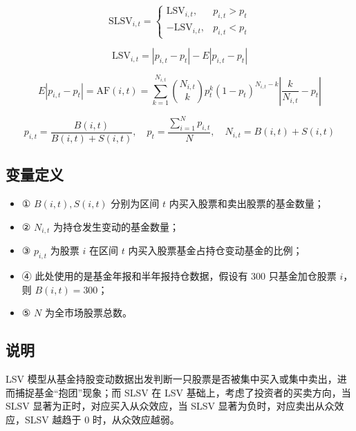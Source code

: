 \documentclass{article}
\begin{document}
\begin{equation}
    \mathrm{SLSV}_{i,t} = 
    \begin{cases} 
        \mathrm{LSV}_{i,t}, & p_{i,t} > p_t \\ 
        -\mathrm{LSV}_{i,t}, & p_{i,t} < p_t 
    \end{cases}
\end{equation}

\begin{equation}
    \mathrm{LSV}_{i,t} = |p_{i,t} - p_t| - E|p_{i,t} - p_t|
\end{equation}

\begin{equation}
    E|p_{i,t} - p_t| = \mathrm{AF}(i,t) = \sum_{k=1}^{N_{i,t}} \binom{N_{i,t}}{k} p_t^k (1 - p_t)^{N_{i,t} - k} \left| \frac{k}{N_{i,t}} - p_t \right|
\end{equation}

\begin{equation}
    p_{i,t} = \frac{B(i,t)}{B(i,t) + S(i,t)}, \quad p_t = \frac{\sum_{i=1}^{N} p_{i,t}}{N}, \quad N_{i,t} = B(i,t) + S(i,t)
\end{equation}

\subsection{变量定义}
\begin{itemize}
    \item ① \( B(i,t), S(i,t) \) 分别为区间 \( t \) 内买入股票和卖出股票的基金数量；
    \item ② \( N_{i,t} \) 为持仓发生变动的基金数量；
    \item ③ \( p_{i,t} \) 为股票 \( i \) 在区间 \( t \) 内买入股票基金占持仓变动基金的比例；
    \item ④ 此处使用的是基金年报和半年报持仓数据，假设有 300 只基金加仓股票 \( i \)，则 \( B(i,t) = 300 \)；
    \item ⑤ \( N \) 为全市场股票总数。
\end{itemize}

\subsection{说明}
LSV 模型从基金持股变动数据出发判断一只股票是否被集中买入或集中卖出，进而捕捉基金“抱团”现象；而 SLSV 在 LSV 基础上，考虑了投资者的买卖方向，当 SLSV 显著为正时，对应买入从众效应，当 SLSV 显著为负时，对应卖出从众效应，SLSV 越趋于 0 时，从众效应越弱。
\end{document}
